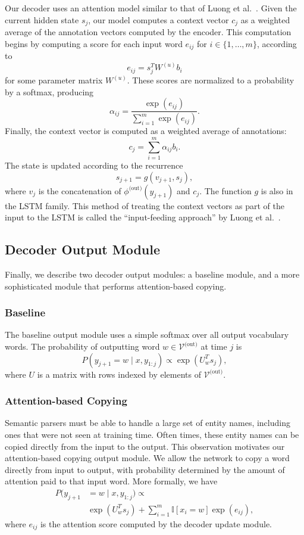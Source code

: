\documentclass[11pt,letterpaper]{article}
\newcommand{\vocabout}{\mathcal{V}^{\text{(out)}}}
\newcommand{\phiout}{\phi^{\text{(out)}}}
\begin{document}
Our decoder uses an attention model similar to that of 
Luong et al.~.
Given the current hidden state $s_j$, our model computes
a context vector $c_j$ as a weighted average of the annotation vectors
computed by the encoder.
This computation begins by computing a score for each input word $e_{ij}$ 
for $i \in \{1, \dotsc, m\}$, according to
\[
  e_{ij} = s_{j}^T W^{(u)} b_i
\]
for some parameter matrix $W^{(u)}$.
These scores are normalized to a probability by a softmax, producing \[
  \alpha_{ij} = \frac{\exp(e_{ij})}{\sum_{i=1}^m \exp(e_{ij})}.
\]
Finally, the context vector is computed as a weighted average of annotations: \[
  c_j = \sum_{i=1}^m \alpha_{ij} b_i.
\]
The state is updated according to the recurrence \[
  s_{j+1} = g(v_{j+1}, s_{j}),
\]
where $v_j$ is the concatenation of $\phiout(y_{j+1})$ and $c_{j}$.
The function $g$ is also in the LSTM family.
This method of treating the context vectors as part of the
input to the LSTM is called the ``input-feeding approach''
by Luong et al.~.

\subsection{Decoder Output Module}
Finally, we describe two decoder output modules: a baseline module, and a
more sophisticated module that performs attention-based copying.

\subsubsection{Baseline}
\label{sec:baseline-output}
The baseline output module uses a simple softmax over all
output vocabulary words.
The probability of outputting word $w \in \vocabout$ at time $j$ is \[
  P(y_{j+1} = w \mid x, y_{1:j}) \propto \exp(U_{w}^T s_j),
\]
where $U$ is a matrix with rows indexed by elements of $\vocabout$.

\subsubsection{Attention-based Copying}
Semantic parsers must be able to handle a large set of entity names,
including ones that were not seen at training time.
Often times, these entity names
can be copied directly from the input to the output.
This observation motivates our attention-based copying output module.
We allow the network to copy a word directly from input to output,
with probability determined by the amount of attention paid to that input word.
More formally, we have
\begin{align*}
  P(y_{j+1} &= w \mid x, y_{1:j}) \propto 
  \\ &\exp(U_{w}^T s_j)
  + \sum_{i=1}^m \mathbb{I}[x_i = w] \exp(e_{ij}),
\end{align*}
where $e_{ij}$ is the attention score computed by the decoder update module.
\end{document}
